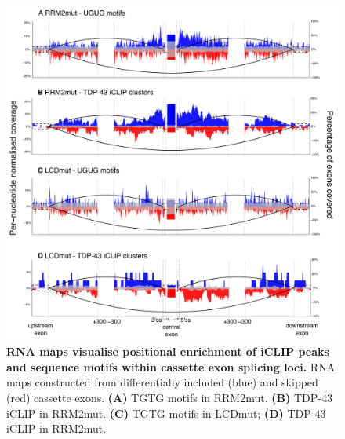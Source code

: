 \begin{figure}[h]
	\centering
	\includegraphics[width=14cm]{Figures/05_tdp_mice/RNAmap_cassettes.png}
	\caption[RNA maps visualise positional enrichment of iCLIP peaks and sequence motifs]{
		\textbf{RNA maps visualise positional enrichment of iCLIP peaks and sequence motifs within cassette exon splicing loci.}
	RNA maps constructed from differentially included (blue) and skipped (red) cassette exons.  
	\textbf{(A)} TGTG motifs in RRM2mut.
	\textbf{(B)} TDP-43 iCLIP in RRM2mut.
	\textbf{(C)} TGTG motifs in LCDmut; 
	\textbf{(D)} TDP-43 iCLIP in RRM2mut.
	}
	\label{fig:RNAmap_cassettes}
\end{figure}

